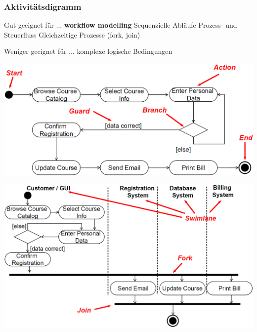 \subsubsection{Aktivitätsdigramm}

\begin{minipage}[t]{0.48\columnwidth}
    \begin{outline}
        \1 Gut geeignet für ...
            \2 \textbf{workflow modelling}
            \2 Sequenzielle Abläufe
            \2 Prozess- und Steuerfluss
            \2 Gleichzeitige Prozesse (fork, join)
    \end{outline}
\end{minipage}
\hfill
\begin{minipage}[t]{0.48\columnwidth}
    \begin{outline}
        \1 Weniger geeignet für ...
            \2 komplexe logische Bedingungen
    \end{outline}
\end{minipage}


\begin{center}
    \includegraphics[width=0.8\columnwidth]{images/aktivitaetsdiagramm_elemente.png}

    \vspace{0.3cm}

    \includegraphics[width=0.8\columnwidth]{images/aktivitaetsdiagramm_parallelitaet.png}
\end{center}

